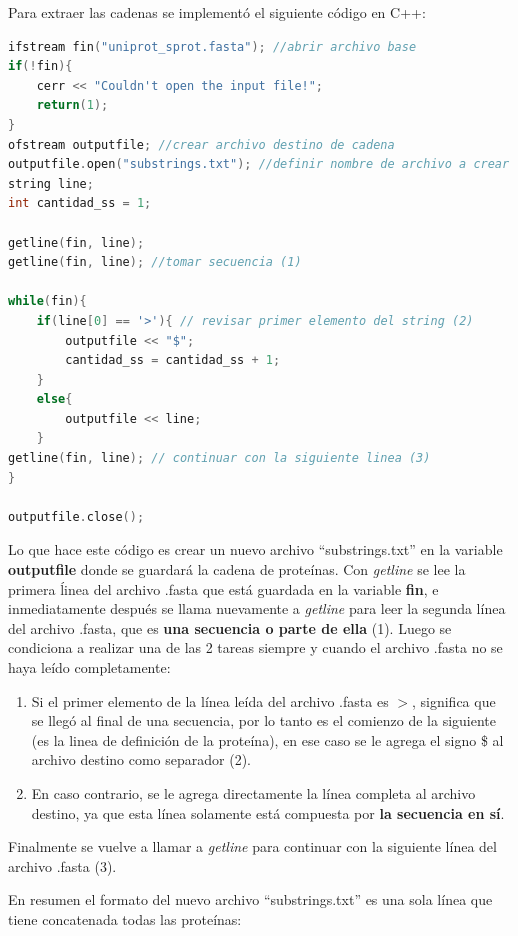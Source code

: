 Para extraer las cadenas se implementó el siguiente código en C++:

\begin{lstlisting}[language=C++, caption=Creación de cadena de proteínas]
ifstream fin("uniprot_sprot.fasta"); //abrir archivo base
if(!fin){
	cerr << "Couldn't open the input file!";
	return(1);
}
ofstream outputfile; //crear archivo destino de cadena
outputfile.open("substrings.txt"); //definir nombre de archivo a crear
string line; 
int cantidad_ss = 1;

getline(fin, line); 
getline(fin, line); //tomar secuencia (1)

while(fin){
	if(line[0] == '>'){ // revisar primer elemento del string (2)
		outputfile << "$";
		cantidad_ss = cantidad_ss + 1;
	}
	else{
		outputfile << line;
	}
getline(fin, line); // continuar con la siguiente linea (3)
}

outputfile.close();
\end{lstlisting}

Lo que hace este código es crear un nuevo archivo ``substrings.txt'' en la variable \textbf{outputfile} donde se guardará la cadena de proteínas. Con \textit{getline} se lee la primera ĺinea del archivo .fasta que está guardada en la variable \textbf{fin}, e inmediatamente después se llama nuevamente a \textit{getline} para leer la segunda línea del archivo .fasta, que es \textbf{una secuencia o parte de ella} (1). Luego se condiciona a realizar una de las 2 tareas siempre y cuando el archivo .fasta no se haya leído completamente: 

\begin{enumerate}
\item Si el primer elemento de la línea leída del archivo .fasta es $>$, significa que se llegó al final de una secuencia, por lo tanto es el comienzo de la siguiente (es la linea de definición de la proteína), en ese caso se le agrega el signo \$ al archivo destino como separador (2). 
\item En caso contrario, se le agrega directamente la línea completa al archivo destino, ya que esta línea solamente está compuesta por \textbf{la secuencia en sí}.
\end{enumerate}

Finalmente se vuelve a llamar a \textit{getline} para continuar con la siguiente línea del archivo .fasta (3).

En resumen el formato del nuevo archivo ``substrings.txt'' es una sola línea que tiene concatenada todas las proteínas:

